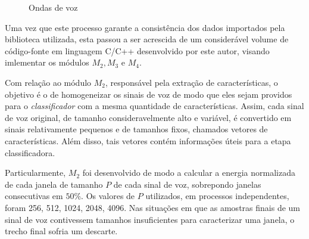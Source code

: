 \documentclass[a4paper,12pt,oneside]{report}
\begin{document}
\begin{figure}[H]
\centering
{}
\caption{Ondas de voz}
\label{fig:comparacao_ondas}
\end{figure}
\par Uma vez que este processo garante a consist\^{e}ncia dos dados importados pela biblioteca utilizada, esta passou a ser acrescida de um consider\'{a}vel volume de c\'{o}digo-fonte em linguagem C/C++ desenvolvido por este autor, visando imlementar os m\'{o}dulos $M_2,M_3$ e $M_4$. 
\\
\par Com rela\c{c}\~{a}o ao m\'{o}dulo $M_2$, respons\'{a}vel pela  extra\c{c}\~{a}o de caracter\'{i}sticas, o objetivo \'{e} o de homogeneizar os sinais de voz de modo que eles sejam providos para o \emph{classificador} com a mesma quantidade de caracter\'{i}sticas. Assim, cada sinal de voz original, de tamanho consideravelmente alto e vari\'{a}vel, \'{e} convertido em sinais relativamente pequenos e de tamanhos fixos, chamados vetores de caracter\'{i}sticas. Al\'{e}m disso, tais vetores cont\'{e}m informa\c{c}\~{o}es \'{u}teis para a etapa classificadora.
\\
\par Particularmente, $M_2$ foi desenvolvido de modo a calcular a energia normalizada de cada janela de tamanho $P$ de cada sinal de voz, sobrepondo janelas consecutivas em $50\%$. Os valores de $P$ utilizados, em processos independentes, foram 256, 512, 1024, 2048, 4096. Nas situa\c{c}\~{o}es em que as amostras finais de um sinal de voz contivessem tamanhos insuficientes para caracterizar uma janela, o trecho final sofria um descarte. 
\\
\end{document}
